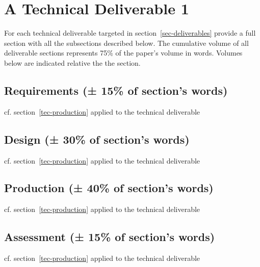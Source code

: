 \section{ A Technical Deliverable 1}
For each technical deliverable targeted in section~\ref{sec-deliverables} provide a full section with all the subsections described below.
The cumulative volume of all deliverable sections represents 75\% of the paper's volume in words. Volumes below are indicated relative the the section.
\label{tec-production}

%
\subsection{Requirements (± 15\% of section's words)}
cf. section~\ref{tec-production} applied to the technical deliverable
\subsection{Design (± 30\% of section's words)}
cf. section~\ref{tec-production} applied to the technical deliverable
\subsection{Production (± 40\% of section's words)}
cf. section~\ref{tec-production} applied to the technical deliverable
\subsection{Assessment (± 15\% of section's words)}
cf. section~\ref{tec-production} applied to the technical deliverable
